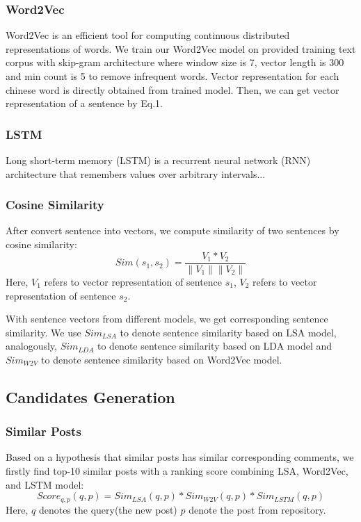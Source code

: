 \documentclass{sig-alternate}
\begin{document}
\subsubsection{Word2Vec}
Word2Vec is an efficient tool for computing continuous distributed 
representations of words\cite{Mikolov}. We train our Word2Vec model on provided training 
text corpus with skip-gram architecture where window size is 7, vector 
length is 300 and min count is 5 to remove infrequent words. Vector 
representation for each chinese word is directly obtained from trained model. 
Then, we can get vector representation of a sentence by Eq.1.

\subsubsection{LSTM}
Long short-term memory (LSTM) is a recurrent neural network (RNN) architecture that remembers values over arbitrary intervals...

\subsubsection{Cosine Similarity} 
After convert sentence into vectors, we compute similarity of two sentences by cosine similarity:
\begin{equation}
   Sim(s_1, s_2) = \frac{V_1 * V_2}{\left \| V_1 \right \| \left \| V_2 \right \|}
\end{equation}
Here, $V_1$ refers to vector representation of sentence $s_1$, $V_2$ refers to vector representation of sentence $s_2$.

With sentence vectors from different models, we get corresponding sentence similarity. We use $Sim_{LSA}$ to denote sentence similarity based on LSA model, analogously, $Sim_{LDA}$ to denote sentence similarity based on LDA model and $Sim_{W2V}$ to denote sentence similarity based on Word2Vec model.

\subsection{Candidates Generation}

\subsubsection{Similar Posts}
Based on a hypothesis that similar posts has similar corresponding comments, we firstly find top-10 similar posts with a ranking score combining LSA, Word2Vec, and LSTM model:
\begin{equation}
   Score_{q,p}(q, p) = Sim_{LSA}(q, p) * Sim_{W2V}(q, p) * Sim_{LSTM}(q, p)
\end{equation}
Here, $q$ denotes the query(the new post) $p$ denote the post from repository.
\end{document}
